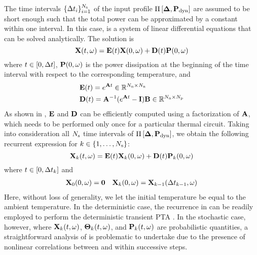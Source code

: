 The time intervals $\{ \Delta t_i \}_{i = 1}^{N_\text{s}}$ of the input profile $\prof{\mP_\dyn}$ are assumed to be short enough such that the total power can be approximated by a constant within one interval. In this case,  is a system of linear differential equations that can be solved analytically. The solution is
\begin{equation} \elabel{ode-solution}
  \vX(\t, \o) = \mE(\t) \vX(0, \o) + \mD(\t) \vP(0, \o)
\end{equation}
where $t \in [0, \Delta t]$, $\mathbf{P}(0, \omega)$ is the power dissipation at the beginning of the time interval with respect to the corresponding temperature, and
\begin{align*}
  & \mE(\t) = e^{\mA \t} \in \real^{\nodes \times \nodes} \\
  & \mD(\t) = \mA^{-1} (e^{\mA \t} - \mI) \mB \in \real^{\nodes \times \cores}
\end{align*}
As shown in \cite{ukhov2012}, $\mE$ and $\mD$ can be efficiently computed using a factorization of $\mA$, which needs to be performed only once for a particular thermal circuit. Taking into consideration all $N_\text{s}$ time intervals of $\prof{\mP_\dyn}$, we obtain the following recurrent expression for $k \in \{ 1, \dotsc, N_\text{s} \}$:
\begin{equation} \elabel{recurrence}
  \vX_k(\t, \o) = \mE(\t) \vX_k(0, \o) + \mD(\t) \vP_k(0, \o)
\end{equation}
where $t \in [ 0, \Delta t_k ]$ and
\begin{align*}
  & \mathbf{X}_0(0, \omega) = \mathbf{0} & \mathbf{X}_k(0, \omega) = \mathbf{X}_{k - 1}(\Delta t_{k - 1}, \omega)
\end{align*}
Here, without loss of generality, we let the initial temperature be equal to the ambient temperature. In the deterministic case, the recurrence in  can be readily employed to perform the deterministic transient PTA \cite{ukhov2012}. In the stochastic case, however, where $\mathbf{X}_k(t, \omega)$, ${\boldsymbol\Theta}_k(t, \omega)$, and $\mathbf{P}_k(t, \omega)$ are probabilistic quantities, a straightforward analysis of  is problematic to undertake due to the presence of nonlinear correlations between and within successive steps.
